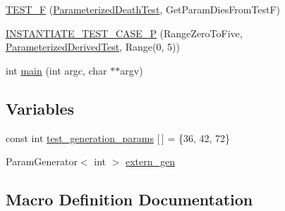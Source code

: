 \begin{DoxyCompactItemize}
\item 
\mbox{\hyperlink{_obj__test_2lib_2googletest-release-1_88_81_2googletest_2test_2googletest-param-test-test_8cc_a0eb7e27c6505d446a1bc3e4fe856a6b2}{T\+E\+S\+T\+\_\+F}} (\mbox{\hyperlink{class_parameterized_death_test}{Parameterized\+Death\+Test}}, Get\+Param\+Dies\+From\+TestF)
\item 
\mbox{\hyperlink{_obj__test_2lib_2googletest-release-1_88_81_2googletest_2test_2googletest-param-test-test_8cc_a95c681268169eb0c79f4578ce1645957}{I\+N\+S\+T\+A\+N\+T\+I\+A\+T\+E\+\_\+\+T\+E\+S\+T\+\_\+\+C\+A\+S\+E\+\_\+P}} (Range\+Zero\+To\+Five, \mbox{\hyperlink{class_parameterized_derived_test}{Parameterized\+Derived\+Test}}, Range(0, 5))
\item 
int \mbox{\hyperlink{_obj__test_2lib_2googletest-release-1_88_81_2googletest_2test_2googletest-param-test-test_8cc_a3c04138a5bfe5d72780bb7e82a18e627}{main}} (int argc, char $\ast$$\ast$argv)
\end{DoxyCompactItemize}
\subsection*{Variables}
\begin{DoxyCompactItemize}
\item 
const int \mbox{\hyperlink{_obj__test_2lib_2googletest-release-1_88_81_2googletest_2test_2googletest-param-test-test_8cc_aefe5c7eafc17e71cec010d92628bf84f}{test\+\_\+generation\+\_\+params}} \mbox{[}$\,$\mbox{]} = \{36, 42, 72\}
\item 
Param\+Generator$<$ int $>$ \mbox{\hyperlink{_obj__test_2lib_2googletest-release-1_88_81_2googletest_2test_2googletest-param-test-test_8cc_a0f691f1461778d71f30b1fb1dea1cb50}{extern\+\_\+gen}}
\end{DoxyCompactItemize}


\subsection{Macro Definition Documentation}
\mbox{\label{_obj__test_2lib_2googletest-release-1_88_81_2googletest_2test_2googletest-param-test-test_8cc_a6414de581a925e7399b27c14e38f8a67}} 
